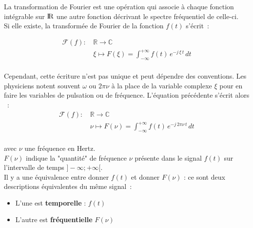 La transformation de Fourier est une opération qui associe à chaque fonction intégrable sur ${\rm I\!R}$ une autre fonction décrivant le spectre fréquentiel de celle-ci. \\

Si elle existe, la transformée de Fourier de la fonction $f(t)$ s'écrit~:

\begin{equation*}
	\begin{split}
		\mathcal{F}(f): \, & \mathbb{R} \rightarrow  \mathbb{C}  \\	
		& \xi \mapsto F(\xi)=\int_{-\infty}^{+\infty}f(t)\,e^{-j\,\xi\,t}\,dt \\
	\end{split}
\end{equation*}

Cependant, cette écriture n'est pas unique et peut dépendre des conventions. Les physiciens notent souvent $\omega$ ou $2\pi\nu$ à la place de la variable complexe $\xi$ pour en faire les variables de pulsation ou de fréquence. L'équation précédente s'écrit alors ~: \\


\begin{equation}
	\begin{split}
		\mathcal{F}(f): \, & \mathbb{R} \rightarrow  \mathbb{C}  \\	
		& \nu \mapsto F(\nu)=\int_{-\infty}^{+\infty}f(t)\,e^{-j\,2\pi\nu\,t}\,dt \\
	\end{split}
\end{equation}

avec $\nu$ une fréquence en Hertz. \\

$F(\nu)$ indique la "quantité" de fréquence $\nu$ présente dans le signal $f(t)$ sur l'intervalle de temps $]-\infty;+\infty[$. \\

Il y a une équivalence entre donner $f(t)$ et donner $F(\nu)$ : ce sont deux descriptions équivalentes du même signal~:\\

\begin{itemize}

	\item L'une est \textbf{temporelle} : $f(t)$ \\

	\item L'autre est \textbf{fréquentielle} $F(\nu)$ \\

\end{itemize}

